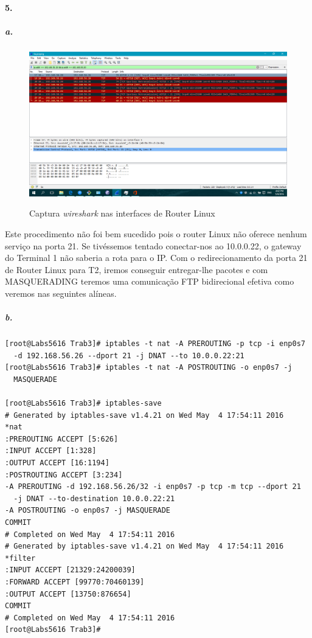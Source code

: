 \newpage

\paragraph{5.}

\subparagraph{a.}

\begin{figure}[h]
\centering
\includegraphics[width=1\textwidth, height=0.3\textheight]{5a.png}
\label{fig:enp0s7}
\caption{Captura \emph{wireshark} nas interfaces de Router Linux}
\end{figure}

Este procedimento não foi bem sucedido pois o router Linux não oferece
nenhum serviço na porta 21. Se tivéssemos tentado conectar-nos ao
10.0.0.22, o gateway do Terminal 1 não saberia a rota para o IP. Com o
redirecionamento da porta 21 de Router Linux para T2, iremos conseguir
entregar-lhe pacotes e com MASQUERADING teremos uma comunicação FTP
bidirecional efetiva como veremos nas seguintes alíneas.

\subparagraph{b.}
\begin{verbatim}
[root@Labs5616 Trab3]# iptables -t nat -A PREROUTING -p tcp -i enp0s7 
  -d 192.168.56.26 --dport 21 -j DNAT --to 10.0.0.22:21
[root@Labs5616 Trab3]# iptables -t nat -A POSTROUTING -o enp0s7 -j
  MASQUERADE

[root@Labs5616 Trab3]# iptables-save
# Generated by iptables-save v1.4.21 on Wed May  4 17:54:11 2016
*nat
:PREROUTING ACCEPT [5:626]
:INPUT ACCEPT [1:328]
:OUTPUT ACCEPT [16:1194]
:POSTROUTING ACCEPT [3:234]
-A PREROUTING -d 192.168.56.26/32 -i enp0s7 -p tcp -m tcp --dport 21 
  -j DNAT --to-destination 10.0.0.22:21
-A POSTROUTING -o enp0s7 -j MASQUERADE
COMMIT
# Completed on Wed May  4 17:54:11 2016
# Generated by iptables-save v1.4.21 on Wed May  4 17:54:11 2016
*filter
:INPUT ACCEPT [21329:24200039]
:FORWARD ACCEPT [99770:70460139]
:OUTPUT ACCEPT [13750:876654]
COMMIT
# Completed on Wed May  4 17:54:11 2016
[root@Labs5616 Trab3]# 
\end{verbatim}


